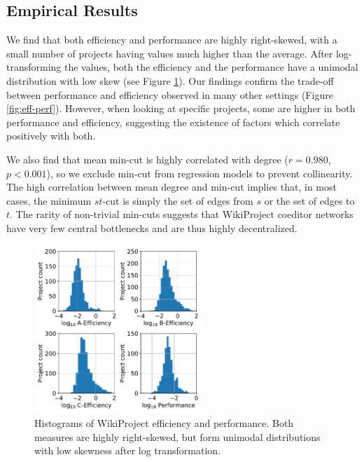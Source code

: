 \subsection{Empirical Results}

We find that both efficiency and performance are highly right-skewed,
with a small number of projects having values much higher than the average.
After log-transforming the values, both the efficiency and the performance have
a unimodal distribution with low skew (see Figure \ref{fig:eff-perf-hist}).
Our findings confirm the trade-off between performance and efficiency
observed in many other settings (Figure \ref{fig:eff-perf}).
However, when looking at specific projects, some are higher in both performance
and efficiency,
suggesting the existence of factors which correlate positively with both.

We also find that mean min-cut is highly correlated with degree ($r=0.980$, $p<0.001$),
so we exclude min-cut from regression models to prevent collinearity.
The high correlation between mean degree and min-cut implies that,
in most cases,
the minimum $st$-cut is simply the set of edges from $s$
or the set of edges to $t$.
The rarity of non-trivial min-cuts suggests that WikiProject coeditor
networks have very few central
bottlenecks and are thus highly decentralized.

\begin{figure}[t!]
\centering
\includegraphics[width=2.5in,height=2.5in]{fig-eff-perf-hist.pdf}
\caption{
Histograms of WikiProject efficiency and performance.
Both measures are highly right-skewed, but form unimodal distributions
with low skewness after log transformation.
\label{fig:eff-perf-hist}
}
\end{figure}

